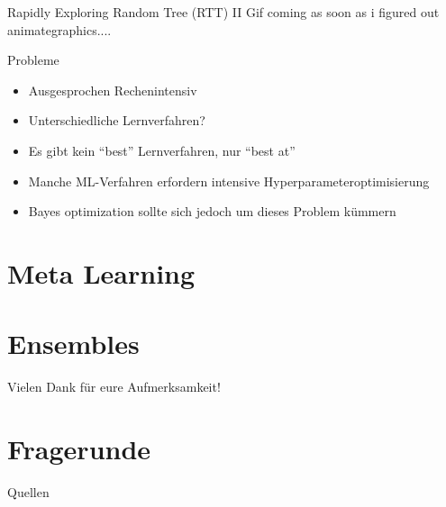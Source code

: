 \documentclass{beamer}
\begin{document}
	\begin{frame}{Rapidly Exploring Random Tree (RTT) II}
		Gif coming as soon as i figured out animategraphics....
	\end{frame}
	
	\begin{frame}{Probleme}
		\begin{itemize}
			\item Ausgesprochen Rechenintensiv
			\item Unterschiedliche Lernverfahren?
			\item Es gibt kein ``best'' Lernverfahren, nur ``best at''
			\item Manche ML-Verfahren erfordern intensive Hyperparameteroptimisierung
			\item Bayes optimization sollte sich jedoch um dieses Problem kümmern
		\end{itemize}
	\end{frame}
	
	\section{Meta Learning}%
	
	
	
	\section{Ensembles}%
	
	
	
	\begin{frame}{}
			Vielen Dank für eure Aufmerksamkeit!
	\end{frame}
	
	\section{Fragerunde}%
	
	\begin{frame}{Quellen}
		
		
	\end{frame}
	
\end{document}
